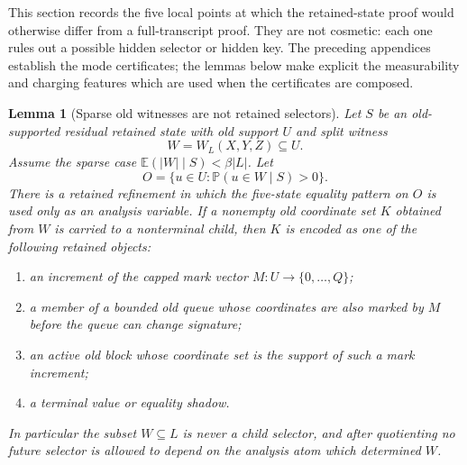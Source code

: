 \documentclass[11pt]{article}
\newtheorem{lemma}[theorem]{Lemma}
\theoremstyle{remark}
\newcommand{\E}{\mathbb E}
\newcommand{\Prob}{\mathbb P}
\begin{document}
This section records the five local points at which the retained-state proof would otherwise differ from a full-transcript proof.  They are not cosmetic: each one rules out a possible hidden selector or hidden key.  The preceding appendices establish the mode certificates; the lemmas below make explicit the measurability and charging features which are used when the certificates are composed.

\begin{lemma}[Sparse old witnesses are not retained selectors]\label{lem:crit-sparse-no-selector}
Let $S$ be an old-supported residual retained state with old support $U$ and split witness
\[
        W=W_L(X,Y,Z)\subseteq U.
\]
Assume the sparse case $\E(|W|\mid S)<\beta |L|$.  Let
\[
        O=\{u\in U:\Prob(u\in W\mid S)>0\}.
\]
There is a retained refinement in which the five-state equality pattern on $O$ is used only as an analysis variable.  If a nonempty old coordinate set $K$ obtained from $W$ is carried to a nonterminal child, then $K$ is encoded as one of the following retained objects:
\begin{enumerate}[label=\textup{(\alph*)}]
\item an increment of the capped mark vector $M:U\to\{0,\ldots,Q\}$;
\item a member of a bounded old queue whose coordinates are also marked by $M$ before the queue can change signature;
\item an active old block whose coordinate set is the support of such a mark increment;
\item a terminal value or equality shadow.
\end{enumerate}
In particular the subset $W\subseteq L$ is never a child selector, and after quotienting no future selector is allowed to depend on the analysis atom which determined $W$.
\end{lemma}
\end{document}
